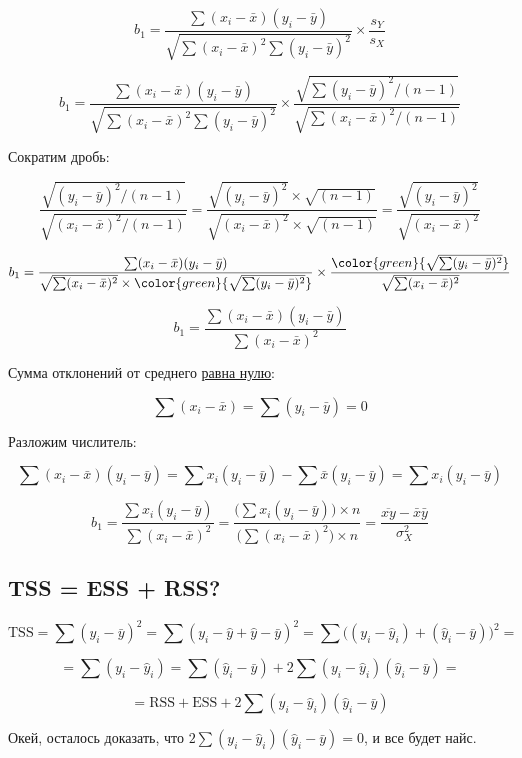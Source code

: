 \documentclass[
  letterpaper,
  DIV=11,
  numbers=noendperiod]{scrreprt}
\theoremstyle{definition}
\theoremstyle{remark}
\begin{document}
\[
b_1 = \frac{\sum (x_i - \bar x)(y_i - \bar y)}{\sqrt{\sum(x_i - \bar x)^2 \sum(y_i - \bar y)^2}}
\times
\frac{s_Y}{s_X}
\]

\[
b_1 = \frac{\sum (x_i - \bar x)(y_i - \bar y)}{\sqrt{\sum(x_i - \bar x)^2 \sum(y_i - \bar y)^2}}
\times
\frac{\sqrt{\sum (y_i - \bar y)^2 / (n-1)}}{\sqrt{\sum (x_i - \bar x)^2 / (n-1)}}
\]

Сократим дробь:

\[
\frac{\sqrt{(y_i - \bar y)^2 / (n-1)}}{\sqrt{(x_i - \bar x)^2 / (n-1)}} = 
\frac{\sqrt{(y_i - \bar y)^2} \times \sqrt{(n-1)}}{\sqrt{(x_i - \bar x)^2} \times \sqrt{(n-1)}} = \frac{\sqrt{(y_i - \bar y)^2}}{\sqrt{(x_i - \bar x)^2}}
\]

\[
b_1 = \frac{\sum (x_i - \bar x)(y_i - \bar y)}{\sqrt{\sum(x_i - \bar x)^2} \times \color{green}{\sqrt{\sum(y_i - \bar y)^2}}}
\times
\frac{\color{green}{\sqrt{\sum(y_i - \bar y)^2}}}{\sqrt{\sum(x_i - \bar x)^2}}
\]

\[
b_1 = \frac{\sum (x_i - \bar x)(y_i - \bar y)}{\sum(x_i - \bar x)^2}
\]

Сумма отклонений от среднего \href{}{равна нулю}:

\[
\sum(x_i - \bar x) = \sum (y_i - \bar y) = 0
\]

Разложим числитель:

\[
\sum (x_i - \bar x) (y_i - \bar y) = 
\sum x_i (y_i - \bar y) - \sum \bar x (y_i - \bar y) = 
\sum x_i (y_i - \bar y)
\]

\[
b_1 = \frac{\sum x_i (y_i - \bar y)}{\sum (x_i - \bar x)^2} = 
\frac{\Big( \sum x_i (y_i - \bar y) \Big) \times n}{\Big( \sum (x_i - \bar x)^2 \Big) \times n} = \frac{\overline{xy} - \bar x \bar y}{\sigma_X^2}
\]

\subsection{TSS = ESS + RSS?}\label{tss-ess-rss}

\[
\mathrm{TSS} = 
\sum (y_i - \bar y)^2 = 
\sum (y_i - \hat y + \hat y - \bar y)^2 = 
\sum \big( (y_i - \hat y_i) + (\hat y_i - \bar y) \big)^2 = 
\]

\[
= \sum (y_i - \hat y_i) = \sum (\hat y_i - \bar y) + 2 \sum (y_i - \hat y_i)(\hat y_i - \bar y) = 
\]

\[
= \mathrm{RSS} + \mathrm{ESS} + 2 \sum (y_i - \hat y_i)(\hat y_i - \bar y)
\]

Окей, осталось доказать, что
\(2 \sum (y_i - \hat y_i)(\hat y_i - \bar y) = 0\), и все будет найс.
\end{document}
